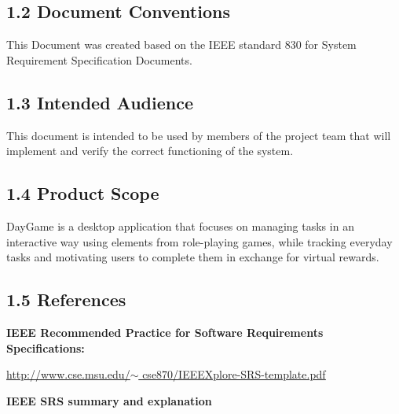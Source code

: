 \documentclass[12pt]{report}
\renewcommand{\_}{\kern-1.5pt\textunderscore\kern-1.5pt}
\begin{document}
\subsection*{1.2 Document Conventions }

\vspace{\baselineskip}
This Document was created based on the IEEE standard 830 for System Requirement Specification Documents. \par

\subsection*{1.3 Intended Audience }

\vspace{\baselineskip}
This document is intended to be used by members of the project team that will implement and verify the correct functioning of the system. \par

\subsection*{1.4 Product Scope}

\vspace{\baselineskip}
DayGame is a desktop application that focuses on managing tasks in an interactive way using elements from role-playing games, while tracking everyday tasks and motivating users to complete them in exchange for virtual rewards. \par


\newpage

\vspace{\baselineskip}\subsection*{1.5 References }
\textbf{IEEE Recommended Practice for Software Requirements Specifications:}\par

\href{http://www.cse.msu.edu/~cse870/IEEEXplore-SRS-template.pdf}{\textcolor[HTML]{1155CC}{\ul{http://www.cse.msu.edu/$ \sim $ cse870/IEEEXplore-SRS-template.pdf}}}\par


\vspace{\baselineskip}
\textbf{IEEE SRS summary and explanation}\par
\end{document}
